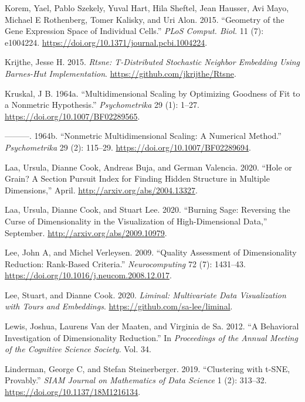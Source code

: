 \documentclass[article,notitle]{jdssv}
\begin{document}
\leavevmode\hypertarget{ref-Korem2015-af}{}%
Korem, Yael, Pablo Szekely, Yuval Hart, Hila Sheftel, Jean Hausser, Avi Mayo, Michael E Rothenberg, Tomer Kalisky, and Uri Alon. 2015. ``Geometry of the Gene Expression Space of Individual Cells.'' \emph{PLoS Comput. Biol.} 11 (7): e1004224. \url{https://doi.org/10.1371/journal.pcbi.1004224}.

\leavevmode\hypertarget{ref-Rtsne}{}%
Krijthe, Jesse H. 2015. \emph{Rtsne: T-Distributed Stochastic Neighbor Embedding Using Barnes-Hut Implementation}. \url{https://github.com/jkrijthe/Rtsne}.

\leavevmode\hypertarget{ref-Kruskal1964-cz}{}%
Kruskal, J B. 1964a. ``Multidimensional Scaling by Optimizing Goodness of Fit to a Nonmetric Hypothesis.'' \emph{Psychometrika} 29 (1): 1--27. \url{https://doi.org/10.1007/BF02289565}.

\leavevmode\hypertarget{ref-Kruskal1964-cw}{}%
---------. 1964b. ``Nonmetric Multidimensional Scaling: A Numerical Method.'' \emph{Psychometrika} 29 (2): 115--29. \url{https://doi.org/10.1007/BF02289694}.

\leavevmode\hypertarget{ref-Laa2020-wr}{}%
Laa, Ursula, Dianne Cook, Andreas Buja, and German Valencia. 2020. ``Hole or Grain? A Section Pursuit Index for Finding Hidden Structure in Multiple Dimensions,'' April. \url{http://arxiv.org/abs/2004.13327}.

\leavevmode\hypertarget{ref-Laa2020-vk}{}%
Laa, Ursula, Dianne Cook, and Stuart Lee. 2020. ``Burning Sage: Reversing the Curse of Dimensionality in the Visualization of High-Dimensional Data,'' September. \url{http://arxiv.org/abs/2009.10979}.

\leavevmode\hypertarget{ref-Lee2009-zb}{}%
Lee, John A, and Michel Verleysen. 2009. ``Quality Assessment of Dimensionality Reduction: Rank-Based Criteria.'' \emph{Neurocomputing} 72 (7): 1431--43. \url{https://doi.org/10.1016/j.neucom.2008.12.017}.

\leavevmode\hypertarget{ref-r-liminal}{}%
Lee, Stuart, and Dianne Cook. 2020. \emph{Liminal: Multivariate Data Visualization with Tours and Embeddings}. \url{https://github.com/sa-lee/liminal}.

\leavevmode\hypertarget{ref-Lewis2012-ai}{}%
Lewis, Joshua, Laurens Van der Maaten, and Virginia de Sa. 2012. ``A Behavioral Investigation of Dimensionality Reduction.'' In \emph{Proceedings of the Annual Meeting of the Cognitive Science Society}. Vol. 34.

\leavevmode\hypertarget{ref-Linderman2019-dq}{}%
Linderman, George C, and Stefan Steinerberger. 2019. ``Clustering with t-SNE, Provably.'' \emph{SIAM Journal on Mathematics of Data Science} 1 (2): 313--32. \url{https://doi.org/10.1137/18M1216134}.
\end{document}
